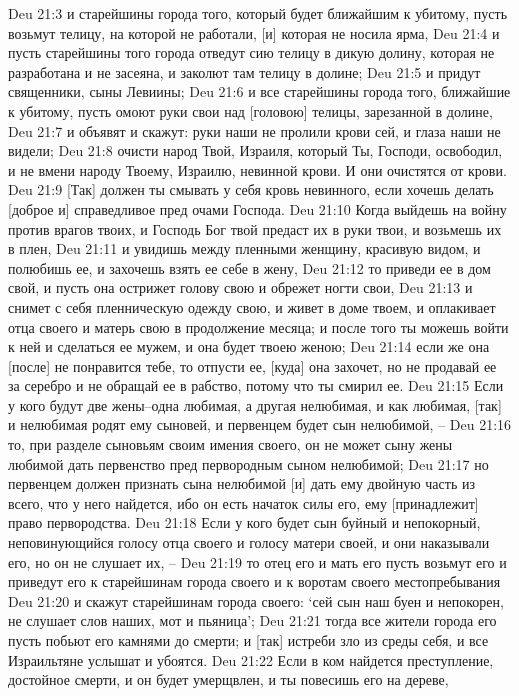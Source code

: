 Deu 21:3  и старейшины города того, который будет ближайшим к убитому, пусть возьмут телицу, на которой не работали, [и] которая не носила ярма,
Deu 21:4  и пусть старейшины того города отведут сию телицу в дикую долину, которая не разработана и не засеяна, и заколют там телицу в долине;
Deu 21:5  и придут священники, сыны Левиины;
Deu 21:6  и все старейшины города того, ближайшие к убитому, пусть омоют руки свои над [головою] телицы, зарезанной в долине,
Deu 21:7  и объявят и скажут: руки наши не пролили крови сей, и глаза наши не видели;
Deu 21:8  очисти народ Твой, Израиля, который Ты, Господи, освободил, и не вмени народу Твоему, Израилю, невинной крови. И они очистятся от крови.
Deu 21:9  [Так] должен ты смывать у себя кровь невинного, если хочешь делать [доброе и] справедливое пред очами Господа.
Deu 21:10  Когда выйдешь на войну против врагов твоих, и Господь Бог твой предаст их в руки твои, и возьмешь их в плен,
Deu 21:11  и увидишь между пленными женщину, красивую видом, и полюбишь ее, и захочешь взять ее себе в жену,
Deu 21:12  то приведи ее в дом свой, и пусть она острижет голову свою и обрежет ногти свои,
Deu 21:13  и снимет с себя пленническую одежду свою, и живет в доме твоем, и оплакивает отца своего и матерь свою в продолжение месяца; и после того ты можешь войти к ней и сделаться ее мужем, и она будет твоею женою;
Deu 21:14  если же она [после] не понравится тебе, то отпусти ее, [куда] она захочет, но не продавай ее за серебро и не обращай ее в рабство, потому что ты смирил ее.
Deu 21:15  Если у кого будут две жены--одна любимая, а другая нелюбимая, и как любимая, [так] и нелюбимая родят ему сыновей, и первенцем будет сын нелюбимой, --
Deu 21:16  то, при разделе сыновьям своим имения своего, он не может сыну жены любимой дать первенство пред первородным сыном нелюбимой;
Deu 21:17  но первенцем должен признать сына нелюбимой [и] дать ему двойную часть из всего, что у него найдется, ибо он есть начаток силы его, ему [принадлежит] право первородства.
Deu 21:18  Если у кого будет сын буйный и непокорный, неповинующийся голосу отца своего и голосу матери своей, и они наказывали его, но он не слушает их, --
Deu 21:19  то отец его и мать его пусть возьмут его и приведут его к старейшинам города своего и к воротам своего местопребывания
Deu 21:20  и скажут старейшинам города своего: `сей сын наш буен и непокорен, не слушает слов наших, мот и пьяница';
Deu 21:21  тогда все жители города его пусть побьют его камнями до смерти; и [так] истреби зло из среды себя, и все Израильтяне услышат и убоятся.
Deu 21:22  Если в ком найдется преступление, достойное смерти, и он будет умерщвлен, и ты повесишь его на дереве,
